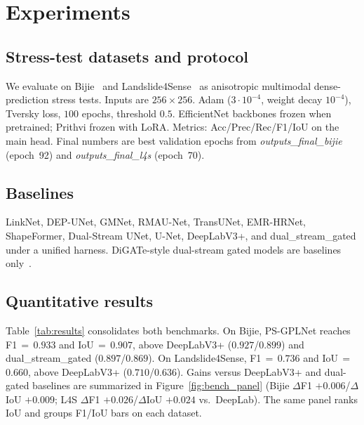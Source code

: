 \documentclass[10pt,twocolumn,letterpaper]{article}
\begin{document}


\section{Experiments}
\subsection{Stress-test datasets and protocol}
We evaluate on Bijie~\cite{ji2020bijie} and Landslide4Sense~\cite{ghorbanzadeh2022landslide4sense} as anisotropic multimodal dense-prediction stress tests. Inputs are $256\times256$. Adam ($3\cdot10^{-4}$, weight decay $10^{-4}$), Tversky loss, $100$ epochs, threshold $0.5$. EfficientNet backbones frozen when pretrained; Prithvi frozen with LoRA. Metrics: Acc/Prec/Rec/F1/IoU on the main head. Final numbers are best validation epochs from \textit{outputs\_final\_bijie} (epoch~92) and \textit{outputs\_final\_l4s} (epoch~70).

\subsection{Baselines}
LinkNet, DEP-UNet, GMNet, RMAU-Net, TransUNet, EMR-HRNet, ShapeFormer, Dual-Stream UNet, U-Net, DeepLabV3+, and dual\_stream\_gated under a unified harness. DiGATe-style dual-stream gated models are baselines only~\cite{islam2024digate}.

\subsection{Quantitative results}
Table~\ref{tab:results} consolidates both benchmarks. On Bijie, PS-GPLNet reaches F1\,$=$\,$0.933$ and IoU\,$=$\,$0.907$, above DeepLabV3+ ($0.927$/$0.899$) and dual\_stream\_gated ($0.897$/$0.869$). On Landslide4Sense, F1\,$=$\,$0.736$ and IoU\,$=$\,$0.660$, above DeepLabV3+ ($0.710$/$0.636$). Gains versus DeepLabV3+ and dual-gated baselines are summarized in Figure~\ref{fig:bench_panel} (Bijie $\Delta$F1 $+0.006$/$\Delta$IoU $+0.009$; L4S $\Delta$F1 $+0.026$/$\Delta$IoU $+0.024$ vs.\ DeepLab). The same panel ranks IoU and groups F1/IoU bars on each dataset.
\end{document}
